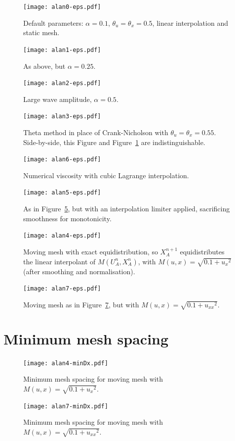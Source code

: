 \documentclass{article}
\begin{document}
\begin{figure}[htbp]
\centering
  \texttt{[image: alan0-eps.pdf]}
  \caption{Default parameters: $\alpha = 0.1$, $\theta_u = \theta_x = 0.5$,
  linear interpolation and static mesh.
  \label{fig:alan0-eps}}
\end{figure}
\begin{figure}[hbtp]
\centering
  \texttt{[image: alan1-eps.pdf]}
  \caption{As above, but $\alpha = 0.25$.
  \label{fig:alan1-eps}}
\end{figure}
\begin{figure}[htbp]
\centering
  \texttt{[image: alan2-eps.pdf]}
  \caption{Large wave amplitude, $\alpha = 0.5$.
  \label{fig:alan2-eps}}
\end{figure}
\begin{figure}[hbtp]
\centering
  \texttt{[image: alan3-eps.pdf]}
  \caption{Theta method in place of Crank-Nicholson with $\theta_u = \theta_x = 0.55$.
    Side-by-side, this Figure and Figure~\ref{fig:alan0-eps} are indistinguishable.
  \label{fig:alan3-eps}}
\end{figure}
\begin{figure}[htbp]
\centering
  \texttt{[image: alan6-eps.pdf]}
  \caption{Numerical viscosity with cubic Lagrange interpolation.
  \label{fig:alan6-eps}}
\end{figure}
\begin{figure}[hbtp]
\centering
  \texttt{[image: alan5-eps.pdf]}
  \caption{As in Figure~\ref{fig:alan6-eps}, but with an interpolation limiter
  applied, sacrificing smoothness for monotonicity.
  \label{fig:alan5-eps}}
\end{figure}
\begin{figure}[htbp]
\centering
  \texttt{[image: alan4-eps.pdf]}
  \caption{Moving mesh with exact equidistribution, so $X_A^{n+1}$
    equidistributes the linear interpolant of $M(U^n_A,X^n_A)$, with
    $M(u,x) = \sqrt{0.1 + {u_x}^2}$ (after smoothing and normalisation).
  \label{fig:alan4-eps}}
\end{figure}
\begin{figure}[hbtp]
\centering
  \texttt{[image: alan7-eps.pdf]}
  \caption{Moving mesh as in Figure~\ref{fig:alan4-eps}, but with
  $M(u,x) = \sqrt{0.1 + {u_{xx}}^2}$.
  \label{fig:alan7-eps}}
\end{figure}

\clearpage
\section{Minimum mesh spacing}

\begin{figure}[hbtp]
\centering
  \texttt{[image: alan4-minDx.pdf]}
  \caption{Minimum mesh spacing for moving mesh with  $M(u,x) = \sqrt{0.1 + {u_{x}}^2}$.
  \label{fig:alan4-minDx}}
\end{figure}
\begin{figure}[hbtp]
\centering
  \texttt{[image: alan7-minDx.pdf]}
  \caption{Minimum mesh spacing for moving mesh with  $M(u,x) = \sqrt{0.1 + {u_{xx}}^2}$.
  \label{fig:alan7-minDx}}
\end{figure}
\end{document}
